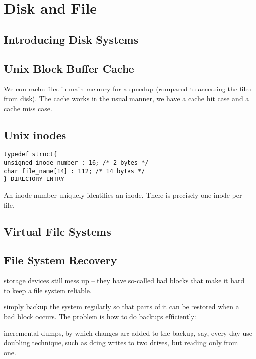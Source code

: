 
\chapter{Disk and File}


\section{Introducing Disk Systems}







\section{Unix Block Buffer Cache}

We can cache files in main memory for a speedup (compared to accessing the files 
from disk). The cache works in the usual manner, we have a cache hit case and a 
cache miss case.



\section{Unix inodes}


\begin{lstlisting}
typedef struct{
unsigned inode_number : 16; /* 2 bytes */
char file_name[14] : 112; /* 14 bytes */
} DIRECTORY_ENTRY
\end{lstlisting}

An inode number uniquely identiﬁes an inode.
There is precisely one inode per ﬁle.

\section{Virtual File Systems}

\section{File System Recovery}

storage devices still mess up – they have
so-called bad blocks that make it hard to keep a ﬁle
system reliable.

simply backup the system regularly so that
parts of it can be restored when a bad block occurs.
The problem is how to do backups efﬁciently:

incremental dumps, by which changes are added
to the backup, say, every day
use doubling technique, such as doing writes to
two drives, but reading only from one.
